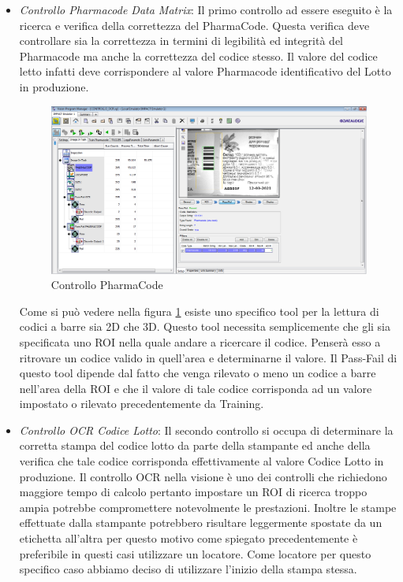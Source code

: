 \documentclass[12pt, a4paper, oneside]{book}
\begin{document}
\begin{itemize}
	\item \textit{Controllo Pharmacode Data Matrix}: Il primo controllo ad essere eseguito è la ricerca e verifica della correttezza del PharmaCode. Questa verifica deve controllare sia la correttezza in termini di legibilità ed integrità del Pharmacode ma anche la correttezza del codice stesso. Il valore del codice letto infatti deve corrispondere al valore Pharmacode identificativo del Lotto in produzione.
	

	
	\begin{figure}[H]
		\centering
		\includegraphics[width=13cm]{Immagini/VIS8}
		\caption{Controllo PharmaCode}
		\label{vis8}
	\end{figure}

	Come si può vedere nella figura \ref{vis8} esiste uno specifico tool per la lettura di codici a barre sia 2D che 3D. Questo tool necessita semplicemente che gli sia specificata uno ROI nella quale andare a ricercare il codice. Penserà esso a ritrovare un codice valido in quell'area e determinarne il valore. Il Pass-Fail di questo tool dipende dal fatto che venga rilevato o meno un codice a barre nell'area della ROI e che il valore di tale codice corrisponda ad un valore impostato o rilevato precedentemente da Training. 
	
	\item \textit{Controllo OCR Codice Lotto}: Il secondo controllo si occupa di determinare la corretta stampa del codice lotto da parte della stampante ed anche della verifica che tale codice corrisponda effettivamente al valore Codice Lotto in produzione. Il controllo OCR nella visione è uno dei controlli che richiedono maggiore tempo di calcolo pertanto impostare un ROI di ricerca troppo ampia potrebbe compromettere notevolmente le prestazioni. Inoltre le stampe effettuate dalla stampante potrebbero risultare leggermente spostate da un etichetta all'altra per questo motivo come spiegato precedentemente è preferibile in questi casi utilizzare un locatore.
	Come locatore per questo specifico caso abbiamo deciso di utilizzare l'inizio della stampa stessa. 
	

\end{itemize}
\end{document}
